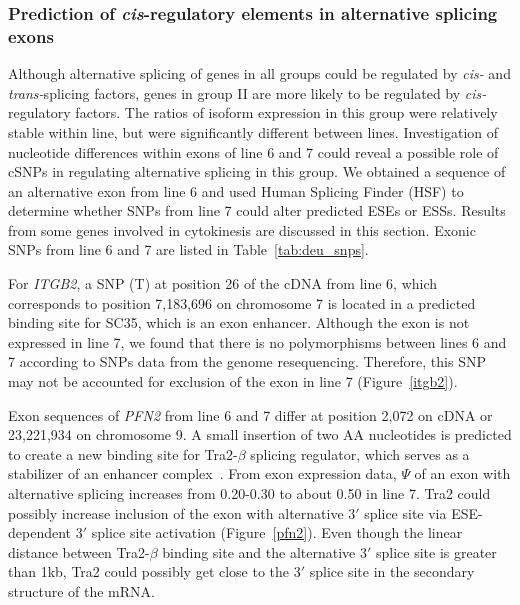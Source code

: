 \documentclass[10pt]{article}
\begin{document}

\subsubsection*{Prediction of {\em cis}-regulatory elements in alternative
splicing exons}

Although alternative splicing of genes in all groups could be regulated by {\em
cis-} and {\em trans-}splicing factors, genes in group II are more likely to be
regulated by {\em cis-}regulatory factors.  The ratios of isoform expression in
this group were relatively stable within line, but were significantly different
between lines.  Investigation of nucleotide differences within exons of line 6
and 7 could reveal a possible role of cSNPs in regulating alternative splicing
in this group.  We obtained a sequence of an alternative exon from line 6 and
used Human Splicing Finder (HSF) to determine whether SNPs from line 7 could
alter predicted ESEs or ESSs.  Results from some genes involved in cytokinesis
are discussed in this section.  Exonic SNPs from line 6 and 7 are listed in
Table~\ref{tab:deu_snps}.

For {\em ITGB2}, a SNP (T) at position 26 of the cDNA from line 6, which
corresponds to position 7,183,696 on chromosome 7 is located in a predicted
binding site for SC35, which is an exon enhancer.  Although the exon is not
expressed in line 7, we found that there is no polymorphisms between lines 6 and
7 according to SNPs data from the genome resequencing.  Therefore, this SNP may
not be accounted for exclusion of the exon in line 7 (Figure~\ref{itgb2}).

Exon sequences of {\em PFN2} from line 6 and 7 differ at position 2,072 on cDNA
or 23,221,934 on chromosome 9.  A small insertion of two AA nucleotides is
predicted to create a new binding site for Tra2-$\beta$ splicing regulator,
which serves as a stabilizer of an enhancer complex~\cite{lopez1998alternative}.
From exon expression data, $\Psi$ of an exon with alternative splicing increases
from 0.20-0.30 to about 0.50 in line 7.  Tra2 could possibly increase inclusion
of the exon with alternative 3$\prime$ splice site via ESE-dependent 3$\prime$
splice site activation (Figure~\ref{pfn2}).  Even though the linear distance
between Tra2-$\beta$ binding site and the alternative 3$\prime$ splice site is
greater than 1kb, Tra2 could possibly get close to the 3$\prime$ splice site in
the secondary structure of the mRNA.
\end{document}
